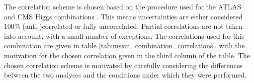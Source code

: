 The correlation scheme is chosen
based on the procedure used for the ATLAS and \ac{CMS}
Higgs combinations \cite{MassComb,CouplComb}. This means
uncertainties are either considered 100\% \mbox{(anti-)correlated} or fully uncorrelated. Partial
correlations are not taken into account, with a small number of exceptions. The
correlations used for this combination are given in table \ref{tab:mssm_combination_correlations},
with the motivation for the chosen correlation given in the third column of the table.
The chosen correlation scheme is motivated
by carefully considering the differences between the two analyses
and the conditions under which they were performed.


